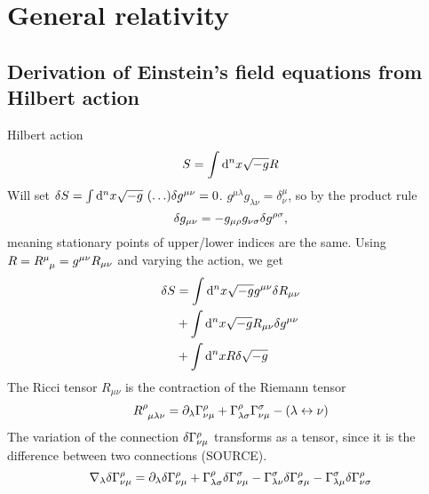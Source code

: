 \appendix

\chapter{General relativity}

\section{Derivation of Einstein's field equations from Hilbert action}
\label{sec:einstein_derivation}

Hilbert action
\begin{equation}
	S = \int \mathop{}\!\mathrm{d}^n x \sqrt{-g} R
\end{equation}
Will set $\variation{S} = \int \dif^n x \sqrt{-g} ( \ldots ) \variation{g^{\mu \nu}} = 0$.
$g^{\mu \lambda} g_{\lambda \nu} = \delta^\mu_\nu$, so by the product rule
\begin{equation}
	\delta g_{\mu \nu} = -g_{\mu \rho} g_{\nu \sigma} \delta g^{\rho \sigma} ,
\end{equation}
meaning stationary points of upper/lower indices are the same.
Using $R = R\indices{^\mu_\mu} = g^{\mu \nu} R_{\mu \nu}$ and varying the action, we get
\begin{equation}
\begin{split}
	\delta S &= \int \mathop{}\!\mathrm{d}^n x \sqrt{-g} g^{\mu \nu} \delta R_{\mu \nu} \\
	              &+ \int \mathop{}\!\mathrm{d}^n x \sqrt{-g} R_{\mu \nu} \delta g^{\mu \nu} \\
	              &+ \int \mathop{}\!\mathrm{d}^n x R \delta \sqrt{-g} \\
\end{split}
\end{equation}
The Ricci tensor $R_{\mu \nu}$ is the contraction of the Riemann tensor
\begin{equation}
	R\indices{^\rho_\mu_\lambda_\nu} = \partial_\lambda \Gamma^{\rho}_{\nu \mu} + \Gamma^\rho_{\lambda \sigma} \Gamma^\sigma_{\nu \mu} - (\lambda \leftrightarrow \nu)
\end{equation}
The variation of the connection $\delta \Gamma^\rho_{\nu \mu}$ transforms as a tensor, since it is the difference between two connections (SOURCE).
\begin{equation}
	\nabla_\lambda \delta \Gamma^\rho_{\nu \mu} = \partial_\lambda \delta \Gamma^\rho_{\nu \mu} 
	                                                 + \Gamma^\rho_{\lambda \sigma} \delta \Gamma{^\sigma_{\nu \mu}} 
	                                                 - \Gamma^\sigma_{\lambda \nu} \delta \Gamma{^\rho_{\sigma \mu}} 
	                                                 - \Gamma^\sigma_{\lambda \mu} \delta \Gamma{^\rho_{\nu \sigma}} 
\end{equation}
